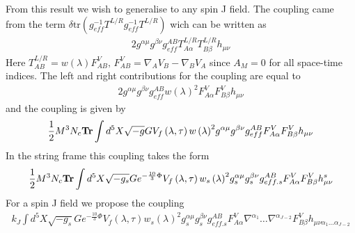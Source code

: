 \documentclass[a4paper,12pt]{article}
\begin{document}
From this result we wish to generalise to any spin J field. The coupling came from the term $\delta \text{tr} \left( g^{-1}_{eff} T^{L/R} g^{-1}_{eff} T^{L/R} \right)$ wich can be written as
\begin{align}
2 g^{\alpha \mu} g^{\beta \nu} g_{eff}^{AB} T^{L/R}_{A \alpha} T^{L/R}_{B \beta} h_{\mu \nu}
\end{align}
Here $T^{L/R}_{AB} = w\left(\lambda\right) F^V_{AB}, \, F^V_{AB} = \nabla_A V_B - \nabla_B V_A$ since $A_M = 0$ for all space-time indices. The left and right contributions for the coupling are equal to
\begin{align}
2 g^{\alpha \mu} g^{\beta \nu} g_{eff}^{AB} {w\left(\lambda\right)}^2 F^{V}_{A \alpha} F^{V}_{B \beta} h_{\mu \nu}
\end{align}
and the coupling is given by
\begin{align}
\frac{1}{2} M^3 N_c \bold{Tr} \int d^5 X \sqrt{-g} G V_{f} \left(\lambda, \tau \right)  {w\left(\lambda\right)}^2 g^{\alpha \mu} g^{\beta \nu} g_{eff}^{AB} F^V_{A \alpha} F^V_{B \beta} h_{\mu \nu}
\end{align}
In the string frame this coupling takes the form
\begin{align}
\frac{1}{2} M^3 N_c \bold{Tr} \int d^5 X \sqrt{-g_{s}} G e^{-\frac{10}{3}\Phi} V_{f} \left(\lambda, \tau \right)  {w_s\left(\lambda\right)}^2 g^{\alpha \mu}_s g^{\beta \nu}_s g_{eff. s}^{AB} F^V_{A \alpha} F^V_{B \beta} h_{\mu \nu}^s
\end{align}
For a spin J field we propose the coupling
\begin{align}
k_J \int d^5X \sqrt{-g_s} G e^{-\frac{10}{3} \Phi} V_f \left( \lambda, \tau \right) {w_s\left(\lambda \right)}^2 g_s^{\alpha \mu} g_s^{\beta \nu} g_{eff. s}^{AB} F^V_{A\alpha} \nabla^{\alpha_1} \dots \nabla^{\alpha_{J-2}} F^V_{B \beta} h_{\mu \nu \alpha_1 \dots \alpha_{J-2}}
\label{eq:spin_J_graviton_coupling}
\end{align}
\end{document}
